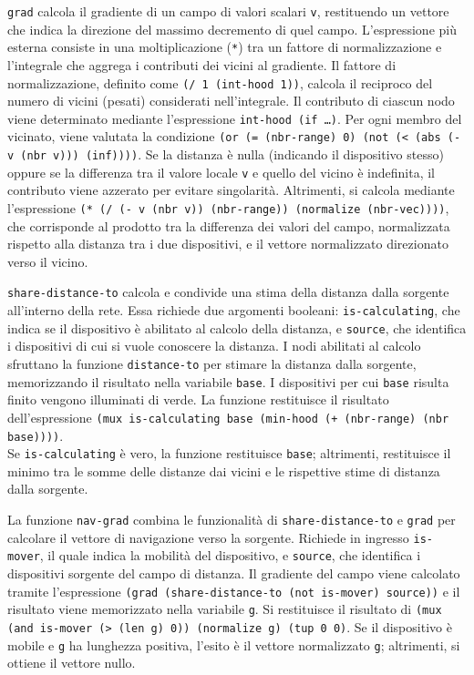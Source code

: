 \texttt{grad} calcola il gradiente di un campo di valori scalari \texttt{v}, restituendo un vettore che indica la direzione del massimo decremento di quel campo.
%
L'espressione più esterna consiste in una moltiplicazione (\texttt{*}) tra un fattore di normalizzazione e l'integrale che aggrega i contributi dei vicini al gradiente. 
%
Il fattore di normalizzazione, definito come \texttt{(/ 1 (int-hood 1))}, calcola il reciproco del numero di vicini (pesati) considerati nell'integrale.
%
Il contributo di ciascun nodo viene determinato mediante l'espressione \texttt{int-hood (if \dots)}.
%
Per ogni membro del vicinato, viene valutata la condizione \texttt{(or (= (nbr-range) 0) (not (< (abs (- v (nbr v))) (inf))))}. Se la distanza è nulla (indicando il dispositivo stesso) oppure se la differenza tra il valore locale \texttt{v} e quello del vicino è indefinita, il contributo viene azzerato per evitare singolarità.%
%
Altrimenti, si calcola mediante l’espressione \texttt{(* (/ (- v (nbr v)) (nbr-range)) (normalize (nbr-vec))))}, che corrisponde al prodotto tra la differenza dei valori del campo, normalizzata rispetto alla distanza tra i due dispositivi, e il vettore normalizzato direzionato verso il vicino.

\texttt{share-distance-to} calcola e condivide una stima della distanza dalla sorgente all’interno della rete. Essa richiede due argomenti booleani: \texttt{is-calculating}, che indica se il dispositivo è abilitato al calcolo della distanza, e \texttt{source}, che identifica i dispositivi di cui si vuole conoscere la distanza.
%
I nodi abilitati al calcolo sfruttano la funzione \texttt{distance-to} per stimare la distanza dalla sorgente, memorizzando il risultato nella variabile \texttt{base}.
%
I dispositivi per cui \texttt{base} risulta finito vengono illuminati di verde.
%
La funzione restituisce il risultato dell'espressione \texttt{(mux is-calculating base (min-hood (+ (nbr-range) (nbr base))))}.
\\
Se \texttt{is-calculating} è vero, la funzione restituisce \texttt{base}; altrimenti, restituisce il minimo tra le somme delle distanze dai vicini e le rispettive stime di distanza dalla sorgente.

La funzione \texttt{nav-grad} combina le funzionalità di \texttt{share-distance-to} e \texttt{grad} per calcolare il vettore di navigazione verso la sorgente.
%
Richiede in ingresso \texttt{is-mover}, il quale indica la mobilità del dispositivo, e \texttt{source}, che identifica i dispositivi sorgente del campo di distanza.
%
Il gradiente del campo viene calcolato tramite l’espressione \texttt{(grad (share-distance-to (not is-mover) source))} e il risultato viene memorizzato nella variabile \texttt{g}.
%
Si restituisce il risultato di \texttt{(mux (and is-mover (> (len g) 0)) (normalize g) (tup 0 0)}.
%
Se il dispositivo è mobile e \texttt{g} ha lunghezza positiva, l'esito è il vettore normalizzato \texttt{g}; altrimenti, si ottiene il vettore nullo.
